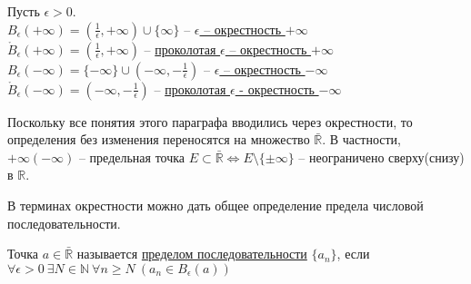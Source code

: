 \begin{definition}
    Пусть $\epsilon > 0$.\\
    $B_{\epsilon}(+\infty) = (\frac{1}{\epsilon}, +\infty) \cup \{\infty\}$ -- \underline{$\epsilon$ -- окрестность $+\infty$}\\
    $\mathring{B}_{\epsilon}(+\infty) = (\frac{1}{\epsilon}, +\infty)$ -- \underline{проколотая $\epsilon$ -- окрестность $+\infty$}\\
    $B_{\epsilon}(-\infty) = \{-\infty\} \cup (-\infty, -\frac{1}{\epsilon})$ -- \underline{$\epsilon$ -- окрестность $-\infty$}\\
    $\mathring{B}_{\epsilon}(-\infty) = (-\infty, -\frac{1}{\epsilon})$ -- \underline{проколотая $\epsilon$ - окрестность $-\infty$}\\
\end{definition}

Поскольку все понятия этого параграфа вводились через окрестности, то определения без изменения переносятся на множество $\bar{\mathds{R}}$.
В частности, $+\infty(-\infty)$ -- предельная точка $E \subset \bar{\mathds{R}} \iff E \setminus \{\pm\infty\}$ -- неограничено сверху(снизу) в $\mathds{R}$.

В терминах окрестности можно дать общее определение предела числовой последовательности.

\begin{definition}
    Точка $a \in \bar{\mathds{R}}$ называется \underline{пределом последовательности} $\{a_{n}\}$, если $\forall \epsilon > 0 \ \exists N \in \mathds{N} \ \forall n \geq N \ (a_{n} \in B_{\epsilon}(a))$
\end{definition}
